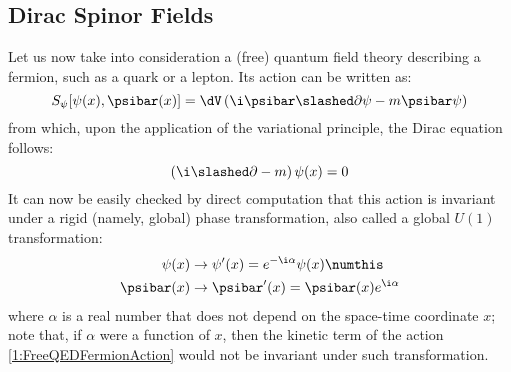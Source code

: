 \subsection{Dirac Spinor Fields}
Let us now take into consideration a (free) quantum field theory describing a fermion, such as a quark or a lepton. Its action can be written as:
\begin{equation}
      S_\psi[\psi(x),\psibar(x)] = \dV \left( \i\psibar\slashed\partial\psi - m\psibar\psi \right) \label{1:FreeQEDFermionAction}
\end{equation}
from which, upon the application of the variational principle, the Dirac equation follows:
\begin{equation}
    \left( \i\slashed\partial-m \right) \psi(x) = 0 \label{1:DiracEq}
\end{equation}
It can now be easily checked by direct computation that this action is invariant under a rigid (namely, global) phase transformation, also called a global $U(1)$ transformation:
\begin{align*}
    \psi(x) &\rightarrow \psi'(x) = e^{-\i\alpha}\psi(x) \numthis\label{1:PhaseTransform} \\
    \psibar(x) &\rightarrow \psibar'(x) = \psibar(x) e^{\i\alpha}
\end{align*}
where $\alpha$ is a real number that does not depend on the space-time coordinate $x$; note that, if $\alpha$ were a function of $x$, then the kinetic term of the action \eqref{1:FreeQEDFermionAction} would not be invariant under such transformation.


